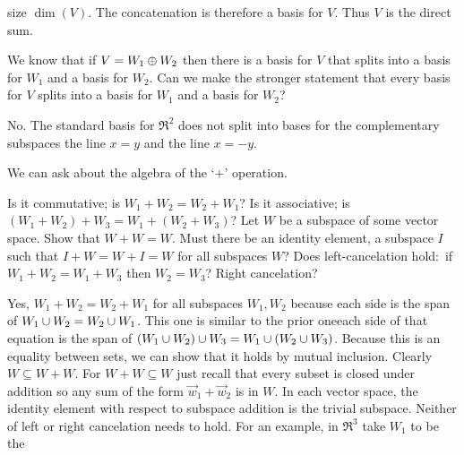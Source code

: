 \begin{exercises}
\begin{answer}
      size \( \dim(V) \).
      The concatenation is therefore a basis for \( V \).
      Thus \( V \) is the direct sum.
     \end{answer}
  \item 
    We know that if \( V=W_1\oplus W_2 \) then there is a basis for
    \( V \) that splits into a basis for \( W_1 \) and a basis for
    \( W_2 \).
    Can we make the stronger statement that every basis for \( V \) splits into
    a basis for \( W_1 \) and a basis for \( W_2 \)?
    \begin{answer}
      No.
      The standard basis for \( \Re^2 \) does not split into bases for
      the complementary subspaces the line \( x=y \) and the line 
      \( x=-y \).  
    \end{answer}
  \item 
     We can ask about the algebra of the `$+$' operation.
     \begin{exparts}
       \partsitem Is it commutative; is \( W_1+W_2=W_2+W_1 \)?
       \partsitem Is it associative; is \( (W_1+W_2)+W_3=W_1+(W_2+W_3) \)?
       \partsitem Let \( W \) be a subspace of some vector space.
         Show that \( W+W=W \).
       \partsitem Must there be an identity element,
         a subspace \( I \) such that \( I+W=W+I=W \) 
         for all subspaces \( W \)? 
       \partsitem Does left-cancelation hold:~if 
          \( W_1+W_2=W_1+W_3 \) then \( W_2=W_3 \)?
          Right cancelation?
    \end{exparts}
    \begin{answer}
      \begin{exparts}
        \partsitem  Yes, \( W_1+W_2=W_2+W_1 \) for all subspaces \( W_1,W_2 \)
          because each side is the span of \( W_1\cup W_2=W_2\cup W_1 \).
        \partsitem This one is similar to the prior one\Dash each side 
          of that equation is the span of
          \( (W_1\cup W_2)\cup W_3=W_1\cup (W_2\cup W_3) \).
        \partsitem Because this is an equality between sets, we can show that
          it holds by mutual inclusion. 
          Clearly \( W\subseteq W+W \).
          For \( W+W\subseteq W \) just recall that every subset is closed 
          under addition so any sum of the form \( \vec{w}_1+\vec{w}_2 \) is in
          \( W \).
        \partsitem In each vector space, the identity element with respect 
          to subspace addition is the trivial subspace.
        \partsitem   Neither of left or right cancelation needs to hold.
          For an example, in \( \Re^3 \) take \( W_1 \) to be the 

\end{exparts}
\end{answer}
\end{exercises}
